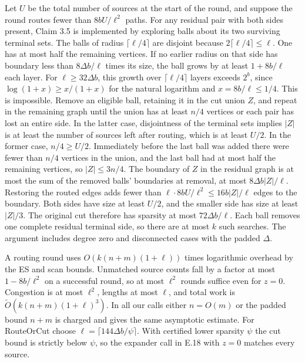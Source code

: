 \documentclass[11pt]{article}
\begin{document}
\begin{itemize}
  Let \(U\) be the total number of sources at the start of the round, and suppose the round routes fewer than \(8bU/\ell^2\) paths. For any residual pair with both sides present, Claim 3.5 is implemented by exploring balls about its two surviving terminal sets. The balls of radius \(\lceil\ell/4\rceil\) are disjoint because \(2\lceil\ell/4\rceil\le\ell\). One has at most half the remaining vertices. If no earlier radius on that side has boundary less than \(8\Delta b/\ell\) times its size, the ball grows by at least \(1+8b/\ell\) each layer. For \(\ell\ge32\Delta b\), this growth over \(\lceil\ell/4\rceil\) layers exceeds \(2^b\), since \(\log(1+x)\ge x/(1+x)\) for the natural logarithm and \(x=8b/\ell\le1/4\). This is impossible. Remove an eligible ball, retaining it in the cut union \(Z\), and repeat in the remaining graph until the union has at least \(n/4\) vertices or each pair has lost an entire side. In the latter case, disjointness of the terminal sets implies \(|Z|\) is at least the number of sources left after routing, which is at least \(U/2\). In the former case, \(n/4\ge U/2\). Immediately before the last ball was added there were fewer than \(n/4\) vertices in the union, and the last ball had at most half the remaining vertices, so \(|Z|\le3n/4\). The boundary of \(Z\) in the residual graph is at most the sum of the removed balls' boundaries at removal, at most \(8\Delta b|Z|/\ell\). Restoring the routed edges adds fewer than \(\ell\cdot8bU/\ell^2\le16b|Z|/\ell\) edges to the boundary. Both sides have size at least \(U/2\), and the smaller side has size at least \(|Z|/3\). The original cut therefore has sparsity at most \(72\Delta b/\ell\). Each ball removes one complete residual terminal side, so there are at most \(k\) such searches. The argument includes degree zero and disconnected cases with the padded \(\Delta\).

  A routing round uses \(O(k(n+m)(1+\ell))\) times logarithmic overhead by the ES and scan bounds. Unmatched source counts fall by a factor at most \(1-8b/\ell^2\) on a successful round, so at most \(\ell^2\) rounds suffice even for \(z=0\). Congestion is at most \(\ell^2\), lengths at most \(\ell\), and total work is \(\widetilde O(k(n+m)(1+\ell)^3)\). In all our calls either \(n=O(m)\) or the padded bound \(n+m\) is charged and gives the same asymptotic estimate. For RouteOrCut choose \(\ell=\lceil144\Delta b/\psi\rceil\). With certified lower sparsity \(\psi\) the cut bound is strictly below \(\psi\), so the expander call in E.18 with \(z=0\) matches every source.


\end{itemize}
\end{document}
